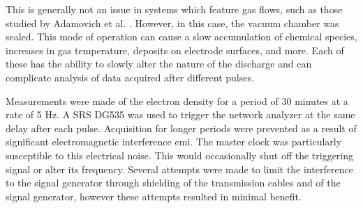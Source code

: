 This is generally not an issue in systems which feature gas flows, such as those
studied by Adamovich et al. \cite{Adamovich2009}. However, in this case, the
vacuum chamber was sealed. This mode of operation can cause a slow accumulation
of chemical species, increases in gas temperature, deposits on electrode
surfaces, and more. Each of these has the ability to slowly alter the nature of
the discharge and can complicate analysis of data acquired after different
pulses.

Measurements were made of the electron density for a period of 30 minutes at a
rate of 5 Hz. A SRS DG535 was used to trigger the network analyzer at the same
delay after each pulse. Acquisition for longer periods were prevented as a
result of significant electromagnetic interference \acs{emi}. The master clock
was particularly susceptible to this electrical noise. This would occasionally
shut off the triggering signal or alter its frequency. Several attempts were
made to limit the interference to the signal generator through shielding of the
transmission cables and of the signal generator, however these attempts resulted
in minimal benefit.

